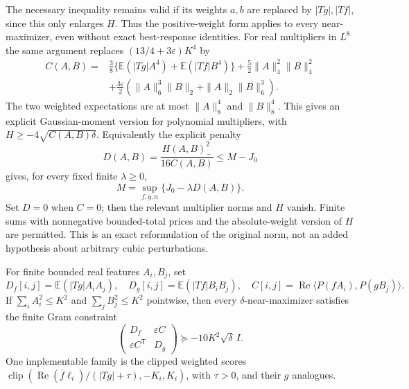 The necessary inequality remains valid if its weights $a,b$ are
replaced by $|Tg|,|Tf|$, since this only enlarges $H$. Thus the
positive-weight form applies to every near-maximizer, even without
exact best-response identities. For real multipliers in $L^8$ the same
argument replaces $(13/4+3\varepsilon)K^4$ by
\begin{align*}
 C(A,B)={}&\frac38\{\mathbb E(|Tg|A^4)+\mathbb E(|Tf|B^4)\}
       +\frac52\|A\|_4^2\|B\|_4^2\\
 &+\frac{3\varepsilon}2
       (\|A\|_6^3\|B\|_2+\|A\|_2\|B\|_6^3).
\end{align*}
The two weighted expectations are at most $\|A\|_8^4$ and
$\|B\|_8^4$. This gives an explicit Gaussian-moment version for
polynomial multipliers, with $H\ge-4\sqrt{C(A,B)\delta}$.
Equivalently the explicit penalty
\[
 D(A,B)=\frac{H(A,B)_-^2}{16C(A,B)}\le M-J_0
\]
gives, for every fixed finite $\lambda\ge0$,
\[
 \boxed{M=\sup_{f,g,n}\{J_0-\lambda D(A,B)\}.}
\]
Set $D=0$ when $C=0$; then the relevant multiplier norms and $H$
vanish. Finite sums with nonnegative bounded-total prices and the
absolute-weight version of $H$ are permitted. This is an exact
reformulation of the original norm, not an added hypothesis about
arbitrary cubic perturbations.

For finite bounded real features $A_i,B_j$, set
\[
 D_f[i,j]=\mathbb E(|Tg|A_iA_j),\quad
 D_g[i,j]=\mathbb E(|Tf|B_iB_j),\quad
 C[i,j]=\operatorname{Re}\langle P(fA_i),P(gB_j)\rangle.
\]
If $\sum_iA_i^2\le K^2$ and $\sum_jB_j^2\le K^2$ pointwise, then
every $\delta$-near-maximizer satisfies the finite Gram constraint
\[
 \begin{pmatrix}D_f&\varepsilon C\\
                 \varepsilon C^{\mathsf T}&D_g\end{pmatrix}
 \succeq-10K^2\sqrt\delta\,I.
\]
One implementable family is the clipped weighted scores
$\operatorname{clip}(\operatorname{Re}(\overline f\ell_i)/
(|Tg|+\tau),-K_i,K_i)$, with $\tau>0$, and their $g$ analogues.


